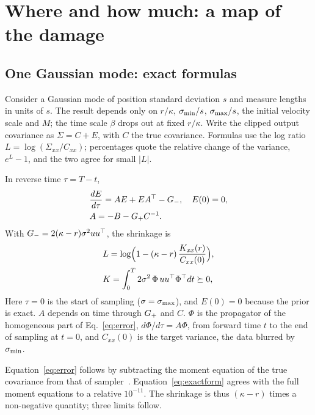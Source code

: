 \section{Where and how much: a map of the damage}
\label{sec:map}

\subsection{One Gaussian mode: exact formulas}
Consider a Gaussian mode of position standard deviation $s$ and measure lengths in units of $s$.
The result depends only on $r/\kappa$, $\sigma_{\min}/s$, $\sigma_{\max}/s$, the initial velocity scale and $M$; the time scale $\beta$ drops out at fixed $r/\kappa$.
Write the clipped output covariance as $\Sigma=C+E$, with $C$ the true covariance.
Formulas use the log ratio $L=\log(\Sigma_{xx}/C_{xx})$; percentages quote the relative change of the variance, $e^{L}-1$, and the two agree for small $|L|$.

\begin{derived}
\label{der:error}
In reverse time $\tau=T-t$,
\begin{equation}
\begin{aligned}
&\frac{dE}{d\tau}=AE+EA^{\top}-G_{-},\quad E(0)=0,\\
&A=-B-G_{+} C^{-1} .
\end{aligned}
\label{eq:error}
\end{equation}
With $G_{-}=2(\kappa-r)\sigma^2uu^{\top}$, the shrinkage is
\begin{equation}
\begin{aligned}
&L=\log\Bigl(1-(\kappa-r)\,\frac{K_{xx}(r)}{C_{xx}(0)}\Bigr),\\
&K=\int_0^T 2\sigma^2\,\Phi\,uu^{\top}\Phi^{\top}dt\succeq0 ,
\end{aligned}
\label{eq:exactform}
\end{equation}
Here $\tau=0$ is the start of sampling ($\sigma=\sigma_{\max}$), and $E(0)=0$ because the prior is exact. $A$ depends on time through $G_{+}$ and $C$. $\Phi$ is the propagator of the homogeneous part of Eq.~\eqref{eq:error}, $d\Phi/d\tau=A\Phi$, from forward time $t$ to the end of sampling at $t=0$, and $C_{xx}(0)$ is the target variance, the data blurred by $\sigma_{\min}$.
\end{derived}

Equation~\eqref{eq:error} follows by subtracting the moment equation of the true covariance from that of sampler~\Sa{}.
Equation~\eqref{eq:exactform} agrees with the full moment equations to a relative $10^{-11}$.
The shrinkage is thus $(\kappa-r)$ times a non-negative quantity; three limits follow.

